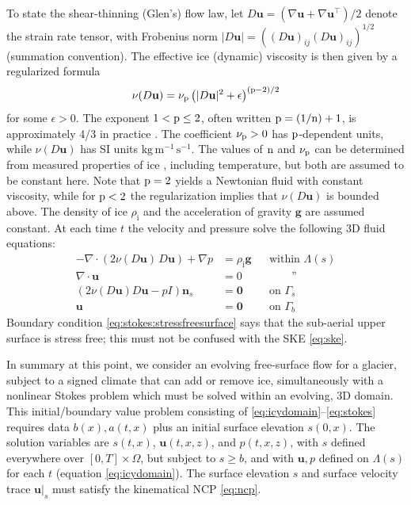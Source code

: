 \documentclass[hidelinks,onefignum,onetabnum,final]{siamart220329}  %
\newcommand{\eps}{\epsilon}
\newcommand{\grad}{\nabla}
\newcommand{\bg}{\mathbf{g}}
\newcommand{\bn}{\mathbf{n}}
\newcommand{\bu}{\mathbf{u}}
\newcommand{\bzero}{\bm{0}}
\newcommand{\nn}{{\text{\textnormal{n}}}}
\newcommand{\pp}{{\text{\textnormal{p}}}}
\newcommand{\rhoi}{\rho_{\text{i}}}
\begin{document}
To state the shear-thinning (Glen's) flow law, let $D\bu=(\grad \bu + \grad \bu^{\top})/2$ denote the strain rate tensor, with Frobenius norm $|D\bu| = \left((D\bu)_{ij} (D\bu)_{ij}\right)^{1/2}$ (summation convention).  The effective ice (dynamic) viscosity \cite{GreveBlatter2009} is then given by a regularized formula
\begin{equation}
\nu(D\bu) = \nu_\pp \left(|D\bu|^2 + \eps\right)^{(\pp-2)/2} \label{eq:glen}
\end{equation}
for some $\eps>0$.  The exponent $1 < \pp \le 2$, often written $\pp=(1/\nn)+1$, is approximately 4/3 in practice \cite{GreveBlatter2009}.  The coefficient $\nu_\pp>0$ has $\pp$-dependent units, while $\nu(D\bu)$ has SI units $\text{kg}\,\text{m}^{-1}\,\text{s}^{-1}$.  The values of $\nn$ and $\nu_\pp$ can be determined from measured properties of ice \cite{GoldsbyKohlstedt2001,GreveBlatter2009}, including temperature, but both are assumed to be constant here.  Note that $\pp=2$ yields a Newtonian fluid with constant viscosity, while for $\pp < 2$ the regularization implies that $\nu(D\bu)$ is bounded above.  The density of ice $\rhoi$ and the acceleration of gravity $\bg$ are assumed constant.  At each time $t$ the velocity and pressure solve the following 3D fluid equations:
\begin{subequations}
\label{eq:stokes}
\begin{align}
- \nabla \cdot \left(2 \nu(D\bu)\, D\bu\right) + \nabla p &= \rhoi \bg && \text{within $\Lambda(s)$} \\
\nabla \cdot \bu &= 0 && \qquad \text{''} \label{eq:stokes:incomp} \\
\left(2 \nu(D\bu) D\bu - pI\right) \bn_s &= \bzero && \text{on $\Gamma_s$}\label{eq:stokes:stressfreesurface} \\
\bu  &= \bzero && \text{on $\Gamma_b$} \label{eq:stokes:noslide}
\end{align}
\end{subequations}
Boundary condition \eqref{eq:stokes:stressfreesurface} says that the sub-aerial upper surface is stress free; this must not be confused with the SKE \eqref{eq:ske}.

In summary at this point, we consider an evolving free-surface flow for a glacier, subject to a signed climate that can add or remove ice, simultaneously with a nonlinear Stokes problem which must be solved within an evolving, 3D domain.  This initial/boundary value problem consisting of \eqref{eq:icydomain}--\eqref{eq:stokes} requires data $b(x),a(t,x)$ plus an initial surface elevation $s(0,x)$.  The solution variables are $s(t,x)$, $\bu(t,x,z)$, and $p(t,x,z)$, with $s$ defined everywhere over $[0,T]\times \Omega$, but subject to $s \ge b$, and with $\bu,p$ defined on $\Lambda(s)$ for each $t$ (equation \eqref{eq:icydomain}).  The surface elevation $s$ and surface velocity trace $\bu|_s$ must satisfy the kinematical NCP \eqref{eq:ncp}.
\end{document}
